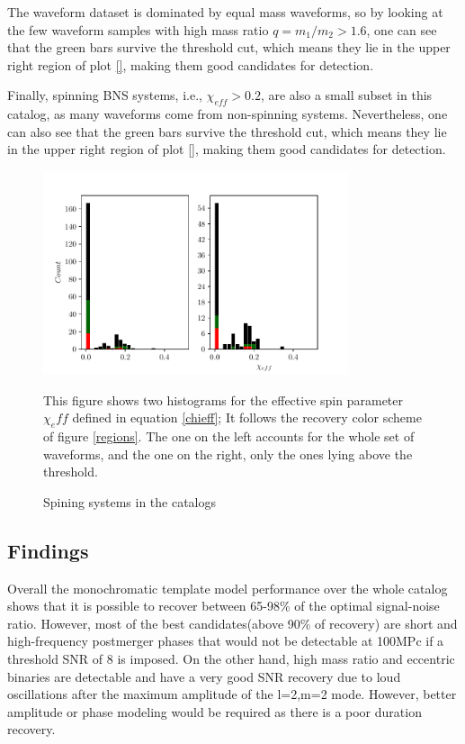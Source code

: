 The waveform dataset is dominated by equal mass waveforms, so by looking at the few waveform samples with high mass ratio $q=m_1/m_2>1.6$, one can see that the green bars survive the threshold cut, which means they lie in the upper right region of plot \ref{}, making them good candidates for detection.
 

\newpage

Finally, spinning BNS systems, i.e., $\chi_{eff}>0.2$, are also a small subset in this catalog, as many waveforms come from non-spinning systems. Nevertheless, one can also see that the green bars survive the threshold cut, which means they lie in the upper right region of plot \ref{}, making them good candidates for detection.

\begin{figure}[hbt!]
\begin{center}
\includegraphics[width=0.8\textwidth, angle=0]{images/Data_analysis/results/alpha_chihist.pdf}
\caption{Spining systems in the catalogs}
\label{achihist}
\end{center}
This figure shows two histograms for the effective spin parameter $\chi_eff$ defined in equation \ref{chieff}; It follows the recovery color scheme of figure \ref{regions}. The one on the left accounts for the whole set of waveforms, and the one on the right, only the ones lying above the threshold.
\end{figure}

\FloatBarrier

\subsection*{Findings}

Overall the monochromatic template model performance over the whole catalog shows that it is possible to recover between 65-98\% of the optimal signal-noise ratio. However, most of the best candidates(above 90\% of recovery) are short and high-frequency postmerger phases that would not be detectable at 100MPc if a threshold SNR of 8 is imposed. On the other hand, high mass ratio and eccentric binaries are detectable and have a very good SNR recovery due to loud oscillations after the maximum amplitude of the l=2,m=2 mode. However, better amplitude or phase modeling would be required as there is a poor duration recovery.


